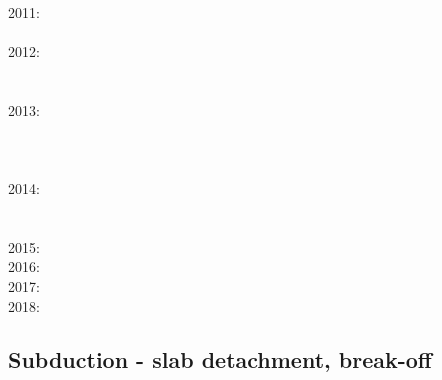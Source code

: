       \cite{moyb10}\cite{zhst10}\\
2011: \cite{lixg11}\cite{list11}\cite{bubj11}\cite{bagw11b}\cite{cafz11}\cite{geme11}\cite{qube11}\\
      \cite{blgg11}\\
2012: \cite{anwb12}\cite{jahu12}\cite{jabi12}\cite{jabk12}\cite{lixg12}\cite{grpy12}\cite{grpy12b}\\
      \cite{ronb12}\cite{tebu12}\cite{thka12}\cite{bova12}\cite{civs12}\cite{camo12}\cite{cafa12} \\
      \cite{gebk12}\cite{liri12}\cite{beva12}\cite{uegb12}\\
2013: \cite{nabg13}\cite{hage13}\cite{ancv13}\cite{namu13}\cite{yosh13}\cite{zhgt13}\cite{lixg13} \\
      \cite{jabr13}\cite{izht13}\cite{luws13}\cite{dusc13}\cite{tibb13}\cite{bubj13}\cite{scmo13} \\
      \cite{fuob13}\cite{magc13}\cite{musi13}\cite{mibg13}\cite{grpy13}\cite{vagd13a}\cite{vagd13b}\\
      \cite{cavg13}\cite{vocg13}\\
2014: \cite{robn14}\cite{hond14}\cite{ronc14}\cite{mobm14}\cite{famc14}\cite{fogm14}\cite{frba14} \\
      \cite{gagd14}\cite{voge14}\cite{voge14b}\cite{lidr14}\cite{bocj04}\cite{bagb14}\cite{stjm14}\\
      \cite{basc14}\cite{vamd14}\\
2015: \cite{bemm15}\cite{bomv15}\cite{bogf15}\cite{ceag15}\cite{kifr15}\cite{vami15}\cite{dali15}\\
2016: \cite{tomy16}\cite{gukt16}\cite{robn16}\\
2017: \cite{kicf17}\cite{sche17}\\
2018: \cite{yamz18}\cite{crli18}

\subsection*{Subduction - slab detachment, break-off}
 

